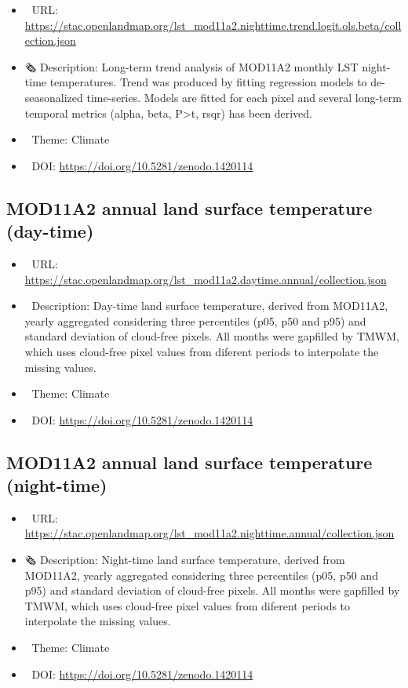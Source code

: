 \documentclass[
  graybox,natbib,nospthms]{svmono}
\providecommand{\tightlist}{%
  \setlength{\itemsep}{0pt}\setlength{\parskip}{0pt}}
\providecommand{\tightlist}{\setlength{\itemsep}{0pt}\setlength{\parskip}{0pt}}
\begin{document}
\begin{itemize}
\tightlist
\item
  🔗 URL: \url{https://stac.openlandmap.org/lst_mod11a2.nighttime.trend.logit.ols.beta/collection.json}
\item
  🗞 Description: Long-term trend analysis of MOD11A2 monthly LST night-time temperatures. Trend was produced by fitting regression models to de-seasonalized time-series. Models are fitted for each pixel and several long-term temporal metrics (alpha, beta, P\textgreater\textbar t\textbar, rsqr) has been derived.
\item
  📝 Theme: Climate
\item
  📂 DOI: \url{https://doi.org/10.5281/zenodo.1420114}
\end{itemize}

\hypertarget{mod11a2-annual-land-surface-temperature-day-time}{%
\subsection{MOD11A2 annual land surface temperature (day-time)}\label{mod11a2-annual-land-surface-temperature-day-time}}

\begin{itemize}
\tightlist
\item
  🔗 URL: \url{https://stac.openlandmap.org/lst_mod11a2.daytime.annual/collection.json}
\item
  📰 Description: Day-time land surface temperature, derived from MOD11A2, yearly aggregated considering three percentiles (p05, p50 and p95) and standard deviation of cloud-free pixels. All months were gapfilled by TMWM, which uses cloud-free pixel values from diferent periods to interpolate the missing values.
\item
  📝 Theme: Climate
\item
  📂 DOI: \url{https://doi.org/10.5281/zenodo.1420114}
\end{itemize}

\hypertarget{mod11a2-annual-land-surface-temperature-night-time}{%
\subsection{MOD11A2 annual land surface temperature (night-time)}\label{mod11a2-annual-land-surface-temperature-night-time}}

\begin{itemize}
\tightlist
\item
  🔗 URL: \url{https://stac.openlandmap.org/lst_mod11a2.nighttime.annual/collection.json}
\item
  🗞 Description: Night-time land surface temperature, derived from MOD11A2, yearly aggregated considering three percentiles (p05, p50 and p95) and standard deviation of cloud-free pixels. All months were gapfilled by TMWM, which uses cloud-free pixel values from diferent periods to interpolate the missing values.
\item
  📝 Theme: Climate
\item
  📂 DOI: \url{https://doi.org/10.5281/zenodo.1420114}
\end{itemize}
\end{document}
